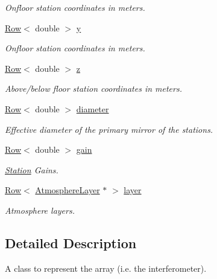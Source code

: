 \begin{DoxyCompactItemize}
\begin{DoxyCompactList}\small\item\em Onfloor station coordinates in meters. \item\end{DoxyCompactList}\item 
\hyperlink{classRow}{Row}$<$ double $>$ \hyperlink{classArray_a2e59fb2a839ee2f10d5264e9624d9239}{y}
\begin{DoxyCompactList}\small\item\em Onfloor station coordinates in meters. \item\end{DoxyCompactList}\item 
\hyperlink{classRow}{Row}$<$ double $>$ \hyperlink{classArray_a88520c63d208d8c2531d06ee26d8dddf}{z}
\begin{DoxyCompactList}\small\item\em Above/below floor station coordinates in meters. \item\end{DoxyCompactList}\item 
\hyperlink{classRow}{Row}$<$ double $>$ \hyperlink{classArray_a4aa89a5ce6246c1b79c2c5c9c7bdc398}{diameter}
\begin{DoxyCompactList}\small\item\em Effective diameter of the primary mirror of the stations. \item\end{DoxyCompactList}\item 
\hyperlink{classRow}{Row}$<$ double $>$ \hyperlink{classArray_ace0fa383a1da1684b91e268beaf41ece}{gain}
\begin{DoxyCompactList}\small\item\em \hyperlink{classStation}{Station} Gains. \item\end{DoxyCompactList}\item 
\hyperlink{classRow}{Row}$<$ \hyperlink{classAtmosphereLayer}{AtmosphereLayer} $\ast$ $>$ \hyperlink{classArray_a8b777c1aa4eac3ce7687da64da7cc958}{layer}
\begin{DoxyCompactList}\small\item\em Atmosphere layers. \item\end{DoxyCompactList}\end{DoxyCompactItemize}


\subsection{Detailed Description}
A class to represent the array (i.e. the interferometer). 

